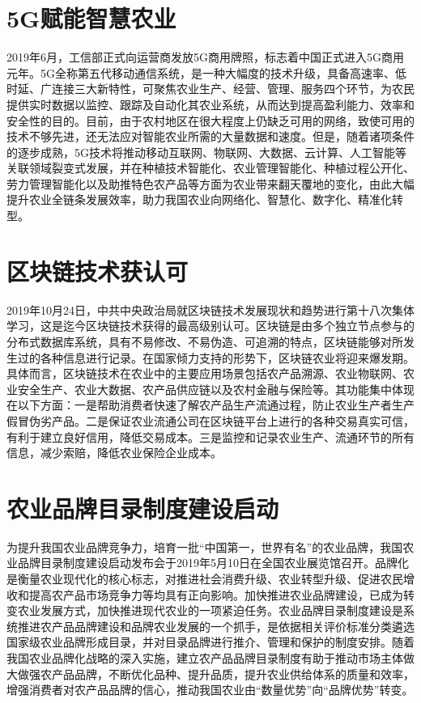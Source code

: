 \documentclass{progbookcn}
\begin{document}
\section{5G赋能智慧农业}
2019年6月，工信部正式向运营商发放5G商用牌照，标志着中国正式进入5G商用元年。5G全称第五代移动通信系统，是一种大幅度的技术升级，具备高速率、低时延、广连接三大新特性，可聚焦农业生产、经营、管理、服务四个环节，为农民提供实时数据以监控、跟踪及自动化其农业系统，从而达到提高盈利能力、效率和安全性的目的。目前，由于农村地区在很大程度上仍缺乏可用的网络，致使可用的技术不够先进，还无法应对智能农业所需的大量数据和速度。但是，随着诸项条件的逐步成熟，5G技术将推动移动互联网、物联网、大数据、云计算、人工智能等关联领域裂变式发展，并在种植技术智能化、农业管理智能化、种植过程公开化、劳力管理智能化以及助推特色农产品等方面为农业带来翻天覆地的变化，由此大幅提升农业全链条发展效率，助力我国农业向网络化、智慧化、数字化、精准化转型。

\section{区块链技术获认可}
2019年10月24日，中共中央政治局就区块链技术发展现状和趋势进行第十八次集体学习，这是迄今区块链技术获得的最高级别认可。区块链是由多个独立节点参与的分布式数据库系统，具有不易修改、不易伪造、可追溯的特点，区块链能够对所发生过的各种信息进行记录。在国家倾力支持的形势下，区块链农业将迎来爆发期。具体而言，区块链技术在农业中的主要应用场景包括农产品溯源、农业物联网、农业安全生产、农业大数据、农产品供应链以及农村金融与保险等。其功能集中体现在以下方面：一是帮助消费者快速了解农产品生产流通过程，防止农业生产者生产假冒伪劣产品。二是保证农业流通公司在区块链平台上进行的各种交易真实可信，有利于建立良好信用，降低交易成本。三是监控和记录农业生产、流通环节的所有信息，减少索赔，降低农业保险企业成本。

\section{农业品牌目录制度建设启动}
为提升我国农业品牌竞争力，培育一批“中国第一，世界有名”的农业品牌，我国农业品牌目录制度建设启动发布会于2019年5月10日在全国农业展览馆召开。品牌化是衡量农业现代化的核心标志，对推进社会消费升级、农业转型升级、促进农民增收和提高农产品市场竞争力等均具有正向影响。加快推进农业品牌建设，已成为转变农业发展方式，加快推进现代农业的一项紧迫任务。农业品牌目录制度建设是系统推进农产品品牌建设和品牌农业发展的一个抓手，是依据相关评价标准分类遴选国家级农业品牌形成目录，并对目录品牌进行推介、管理和保护的制度安排。随着我国农业品牌化战略的深入实施，建立农产品品牌目录制度有助于推动市场主体做大做强农产品品牌，不断优化品种、提升品质，提升农业供给体系的质量和效率，增强消费者对农产品品牌的信心，推动我国农业由“数量优势”向“品牌优势”转变。
\end{document}
